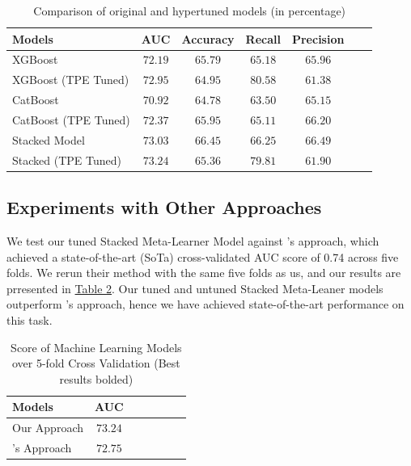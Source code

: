 \documentclass[pdflatex,sn-basic,10pt]{sn-jnl}%
\newcommand{\reftable}[1]{\hyperref[#1]{Table \ref*{#1}}}
\begin{document}
\begin{table}[ht]
\centering
\caption{Comparison of original and hypertuned models (in percentage)}
\label{tab:hypertuning}
\begin{tabular}{@{}lcccccc@{}}
\toprule
 \textbf{Models} & \textbf{AUC} & \textbf{Accuracy} & \textbf{Recall}  & \textbf{Precision} \\ \midrule
XGBoost & $72.19$ & $65.79$ & $65.18$ & $65.96$ \\ %
 XGBoost (TPE Tuned) & $72.95$ & $64.95$ & $\mathbf{80.58}$ & $61.38$ \\ \hline
CatBoost & $70.92$ & $64.78$ & $63.50$ & $65.15$ \\ %
 CatBoost (TPE Tuned) & $72.37$ & $65.95$ & $65.11$ & $66.20$ \\ \hline
 Stacked Model & $73.03$ & $\mathbf{66.45}$ & $66.25$ & $\mathbf{66.49}$ \\ %
 Stacked (TPE Tuned) & $\mathbf{73.24}$ & $65.36$ & $79.81$ & $61.90$ \\ \bottomrule %
\end{tabular}%
\vspace{-2ex}
\end{table}

\subsection{Experiments with Other Approaches}

We test our tuned Stacked Meta-Learner Model against \cite{shahini2019}'s approach, which achieved a state-of-the-art (SoTa) cross-validated AUC score of 0.74 across five folds. We rerun their method with the same five folds as us, and our results are prresented in \reftable{tab:comparisons}. Our tuned and untuned Stacked Meta-Leaner models outperform \cite{shahini2019}'s approach, hence we have achieved state-of-the-art performance on this task.

\begin{table}[ht]
\centering
\caption{Score of Machine Learning Models over 5-fold Cross Validation (Best results bolded)}
\label{tab:comparisons}
\begin{tabular}{@{}lcccccc@{}}
\toprule
 \textbf{Models} & \textbf{AUC} \\ \midrule
Our Approach & $\mathbf{73.24}$ \\
\cite{shahini2019}'s Approach & $72.75$ \\
 \bottomrule
\end{tabular}%
\vspace{-20pt}
\end{table}
\end{document}
